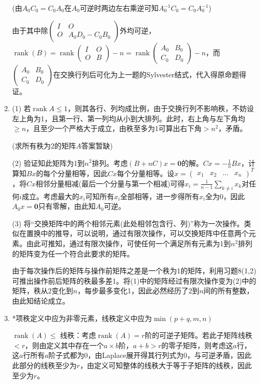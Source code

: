 \documentclass[a4paper,UTF8,fontset=windows]{ctexart}
\DeclareMathOperator{\rank}{rank}
\begin{document}
\begin{enumerate}
(由$A_0C_0=C_0A_0$在$A_0$可逆时两边左右乘逆可知$A_0^{-1}C_0=C_0A_0^{-1}$)

由于其中除$\begin{pmatrix}I&O\\O&A_0D_0-C_0B_0\end{pmatrix}$外均可逆，$\rank(B)=\rank\begin{pmatrix}I&O\\O&B\end{pmatrix}-n=\rank\begin{pmatrix}A_0&B_0\\C_0&D_0\end{pmatrix}-n$，而$\begin{pmatrix}A_0&B_0\\C_0&D_0\end{pmatrix}$在交换行列后可化为上一题的Sylvester结式，代入得原命题得证。

\item
(1) 若$\rank{A}\le1$，则其各行、列均成比例，由于交换行列不影响秩，不妨设左上角为1，且第一行、第一列均从小到大排列。此时，右上角与左下角均$\ge n$，且至少一个严格大于成立，由秩至多为1可算出右下角$>n^2$，矛盾。

(求所有秩为2的矩阵$A$答案暂缺)

(2) 验证知此矩阵为1到$n^2$排列。考虑$(B+nC)x=\mathbf{0}$的解。$Cx=-\frac{1}{n}Bx$，计算知$Bx$的每个分量相等，因此$Cx$每个分量相等。设$x=\begin{pmatrix}x_1&x_2&\dots&x_n\end{pmatrix}^T$，将$Cx$相邻分量相减(最后一个分量与第一个相减)可得$x_i=\frac{1}{n-1}\sum_{k\ne i}{x_k}$对任何$i$成立。考虑最大的$x_i$可知所有$x_i$全部相等，进一步得所有$x_i$全为0，因此$A_0x=\mathbf{0}$只有零解，由此知$A_0$可逆。

(3) 将“交换矩阵中的两个相邻元素(此处相邻包含行、列)”称为一次操作。类似在置换中的推导，可以说明，通过有限次操作，可以交换矩阵中任意两个元素。由此可推知，通过有限次操作，可使任何一个满足所有元素为1到$n^2$排列的矩阵变为任一个符合此要求的矩阵。

由于每次操作后的矩阵与操作前矩阵之差是一个秩为1的矩阵，利用习题8(1,2)可推出操作前后矩阵的秩最多差1。将(1)中的矩阵经过有限次操作变为(2)中的矩阵，秩从2变化到$n$，每步最多变化1，因此必然经历了2到$n$间的所有整数，由此知结论成立。

\item
*项秩定义中应为非零元素，线秩定义中应为$\min(p+q,m,n)$

$\rank(A)\le$ 线秩：考虑$\rank(A)=r$阶的可逆子矩阵。若此子矩阵线秩$<r$，则由定义其中存在一个$a\times b$阶，$a+b>r$的零子矩阵，则考虑这$a$行，这$a$行所有$a$阶子式都为0，由Laplace展开得其行列式为0，与可逆矛盾，因此此部分的线秩至少为$r$，由定义可知整体的线秩大于等于子矩阵的线秩，因此至少为$r$。


\end{enumerate}
\end{document}
